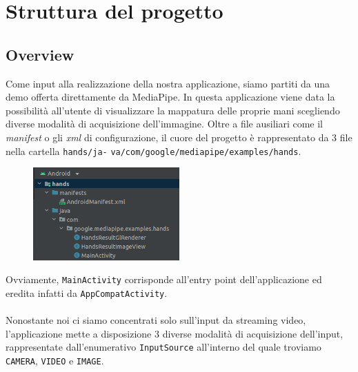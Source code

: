 \chapter{Struttura del progetto}

\section{Overview}
Come input alla realizzazione della nostra applicazione, siamo partiti da una demo offerta direttamente da MediaPipe. In questa applicazione viene data la possibilità all'utente di visualizzare la mappatura delle proprie mani scegliendo diverse modalità di acquisizione dell'immagine.
Oltre a file ausiliari come il \textit{manifest} o gli \textit{xml} di configurazione, il cuore del progetto è rappresentato da 3 file nella cartella \texttt{hands/ja-} \texttt{va/com/google/mediapipe/examples/hands}.
\begin{figure}[H]
    \centering
    \includegraphics[width=0.5\textwidth]{images/struct_demo.png}
\end{figure}
\noindent Ovviamente, \texttt{MainActivity} corrisponde all'entry point dell'applicazione ed eredita infatti da \texttt{AppCompatActivity}.\\
\\
\noindent Nonostante noi ci siamo concentrati solo sull'input da streaming video, l'applicazione mette a disposizione 3 diverse modalità di acquisizione dell'input, rappresentate dall'enumerativo \texttt{InputSource} all'interno del quale troviamo \texttt{CAMERA}, \texttt{VIDEO} e \texttt{IMAGE}.\\


